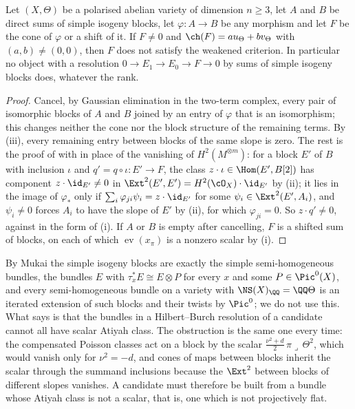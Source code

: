 \begin{theorem}
\label{thm:noblocks}
Let $(X,\Theta)$ be a polarised abelian variety of dimension $n\ge3$, let $A$
and $B$ be direct sums of simple isogeny blocks, let $\varphi\colon A\to B$
be any morphism and let $F$ be the cone of $\varphi$ or a shift of it. If
$F\ne0$ and $\ch(F)=au_{\Theta}+bv_{\Theta}$ with $(a,b)\ne(0,0)$, then $F$
does not satisfy the weakened criterion. In particular no object with a
resolution $0\to E_{1}\to E_{0}\to F\to0$ by sums of simple isogeny blocks
does, whatever the rank.
\end{theorem}

\begin{proof}
Cancel, by Gaussian elimination in the two-term complex, every pair of
isomorphic blocks of $A$ and $B$ joined by an entry of $\varphi$ that is an
isomorphism; this changes neither the cone nor the block structure of the
remaining terms. By (iii), every remaining entry between
blocks of the same slope is zero. The rest is the proof of
 with  in place of the vanishing of
$H^{2}(M^{\otimes m})$: for a block $E'$ of $B$ with inclusion $\iota$ and
$q'=q\circ\iota\colon E'\to F$, the class $z\cdot\iota\in\Hom(E',B[2])$ has
component $z\cdot\id_{E'}\ne0$ in $\Ext^{2}(E',E')=H^{2}(\cO_{X})\cdot\id_{E'}$
by (ii); it lies in the image of $\varphi_{*}$ only if
$\sum_{i}\varphi_{ji}\psi_{i}=z\cdot\id_{E'}$ for some
$\psi_{i}\in\Ext^{2}(E',A_{i})$, and $\psi_{i}\ne0$ forces $A_{i}$ to have
the slope of $E'$ by (ii), for which $\varphi_{ji}=0$. So $z\cdot q'\ne0$,
against  in the form of (i). If $A$ or $B$ is empty
after cancelling, $F$ is a shifted sum of blocks, on each of which
$\operatorname{ev}(x_{\pi})$ is a nonzero scalar by (i).
\end{proof}

\begin{remark}\label{rem:blocks}
By Mukai \cite{Muk78} the simple isogeny blocks are exactly the simple
semi-homogeneous bundles, the bundles $E$ with $\tau_{x}^{*}E\cong E\otimes P$
for every $x$ and some $P\in\Pic^{0}(X)$, and every semi-homogeneous bundle
on a variety with $\NS(X)_{\QQ}=\QQ\Theta$ is an iterated extension of such
blocks and their twists by $\Pic^{0}$; we do not use this. What
 says is that the bundles in a Hilbert--Burch resolution
of a candidate cannot all have scalar Atiyah class. The obstruction is the
same one every time: the compensated Poisson classes act on a block by the
scalar $\tfrac{\nu^{2}+d}{2}\,\pi\lrcorner\,\Theta^{2}$, which would vanish only
for $\nu^{2}=-d$, and cones of maps between blocks inherit the scalar through
the summand inclusions because the $\Ext^{2}$ between blocks of different
slopes vanishes. A candidate must therefore be built from a bundle whose
Atiyah class is not a scalar, that is, one which is not projectively flat.
\end{remark}

